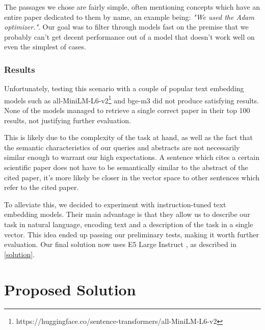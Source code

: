 \documentclass[12pt,a4paper]{report}
\begin{document}
The passages we chose are fairly simple, often mentioning concepts which have an entire paper dedicated to them by name, an example being: \textit{"We used the Adam optimizer."}. Our goal was to filter through models fast on the premise that we probably can't get decent performance out of a model that doesn't work well on even the simplest of cases.

\subsection{Results}

Unfortunately, testing this scenario with a couple of popular text embedding models such as all-MiniLM-L6-v2\footnote{https://huggingface.co/sentence-transformers/all-MiniLM-L6-v2} and bge-m3 \cite{Chen2024BGEMM} did not produce satisfying results. None of the models managed to retrieve a single correct paper in their top 100 results, not justifying further evaluation.

This is likely due to the complexity of the task at hand, as well as the fact that the semantic characteristics of our queries and abstracts are not necessarily similar enough to warrant our high expectations. A sentence which cites a certain scientific paper does not have to be semantically similar to the abstract of the cited paper, it's more likely be closer in the vector space to other sentences which refer to the cited paper.

To alleviate this, we decided to experiment with instruction-tuned text embedding models. Their main advantage is that they allow us to describe our task in natural language, encoding text and a description of the task in a single vector. This idea ended up passing our preliminary tests, making it worth further evaluation. Our final solution now uses E5 Large Instruct \cite{Wang2024MultilingualET}, as described in \autoref{solution}.

\chapter{Proposed Solution} \label{solution}

\end{document}
